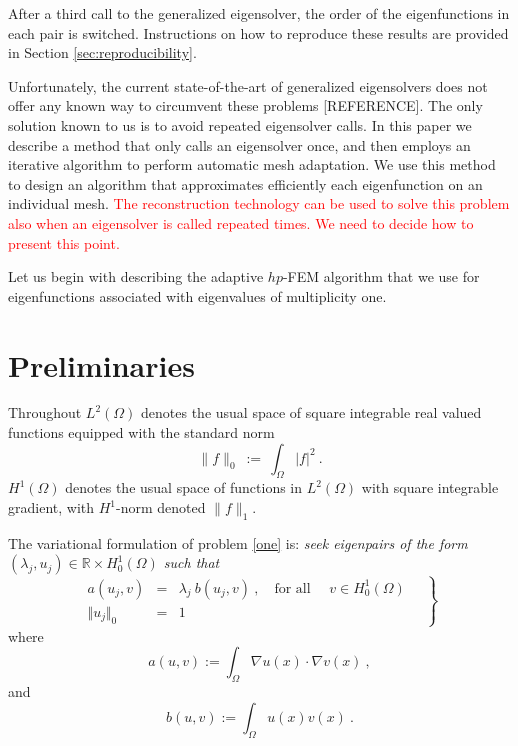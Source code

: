 \documentclass[preprint ,12pt]{elsarticle}
\begin{document}
After a third call to the generalized eigensolver, the order of the 
eigenfunctions in each pair is switched. Instructions on how to reproduce 
these results are provided in Section \ref{sec:reproducibility}.

Unfortunately, the current 
state-of-the-art of generalized eigensolvers does not offer any known
way to circumvent these problems [REFERENCE]. The only solution known 
to us is to avoid repeated eigensolver calls. In this paper we describe 
a method that only calls an eigensolver once, and then employs an iterative 
algorithm to perform automatic mesh adaptation. We use this method to 
design an algorithm that approximates efficiently each eigenfunction on 
an individual mesh. \textcolor{red}{The reconstruction technology can be used to solve this problem also when an eigensolver is called repeated times. We need to decide how to present this point.}

Let us begin with describing the adaptive $hp$-FEM algorithm
that we use for eigenfunctions associated with eigenvalues
of multiplicity one.


\section{Preliminaries}

Throughout $L^2(\Omega)$
denotes the usual space of square integrable real valued functions
equipped with the standard norm
\begin{equation}\label{eq:l2}
\|f\|_{0}\ :=\ \int_\Omega  |f|^2\ .
\end{equation}
$H^1(\Omega)$ denotes the usual space of functions in $L^2(\Omega)$
with square integrable gradient, with  $H^1$-norm denoted $\|f\|_1$.

The variational formulation of problem \eqref{one} is:
\emph{seek eigenpairs of the form $(\lambda_j,u_j)\in
\mathbb{R}\times H^1_0(\Omega)$
such that}
\begin{equation}
\label{eq:var_prob}
\left.
\begin{array}{lcl}
a(u_j,v)&=& \lambda_j\ b(u_j,v)\ ,
\quad \text{for all } \quad v  \in H^1_0(\Omega)\\
 \Vert u_j \Vert_{0} &=& 1
\end{array}\quad
\right\}
\end{equation}
where
\begin{equation}\label{eq:a}
a(u,v):=\int_\Omega \nabla u(x)\cdot \nabla v(x)\ ,
\end{equation}
and
\begin{equation}\label{eq:b}
b(u,v):=\int_\Omega u(x) v(x)\ .
\end{equation}
\end{document}
